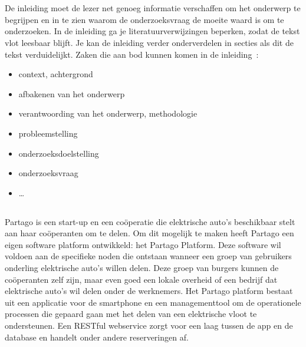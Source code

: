 
\chapter{}
\label{ch:inleiding}

De inleiding moet de lezer net genoeg informatie verschaffen om het onderwerp te begrijpen en in te zien waarom de onderzoeksvraag de moeite waard is om te onderzoeken. In de inleiding ga je literatuurverwijzingen beperken, zodat de tekst vlot leesbaar blijft. Je kan de inleiding verder onderverdelen in secties als dit de tekst verduidelijkt. Zaken die aan bod kunnen komen in de inleiding~\autocite{Pollefliet2011}:

\begin{itemize}
  \item context, achtergrond
  \item afbakenen van het onderwerp
  \item verantwoording van het onderwerp, methodologie
  \item probleemstelling
  \item onderzoeksdoelstelling
  \item onderzoeksvraag
  \item \ldots
\end{itemize}

\section{}
\label{sec:probleemstelling}
Partago is een start-up en een coöperatie die elektrische auto's beschikbaar stelt aan haar coöperanten om te delen. Om dit mogelijk te maken heeft Partago een eigen software platform ontwikkeld: het Partago Platform. Deze software wil voldoen aan de specifieke noden die ontstaan wanneer een groep van gebruikers onderling elektrische auto's willen delen. Deze groep van burgers kunnen de coöperanten zelf zijn, maar even goed een lokale overheid of een bedrijf dat elektrische auto's wil delen onder de werknemers. Het Partago platform bestaat uit een applicatie voor de smartphone en een managementtool om de operationele processen die gepaard gaan met het delen van een elektrische vloot te ondersteunen. Een RESTful webservice zorgt voor een laag tussen de app en de database en handelt onder andere reserveringen af.

